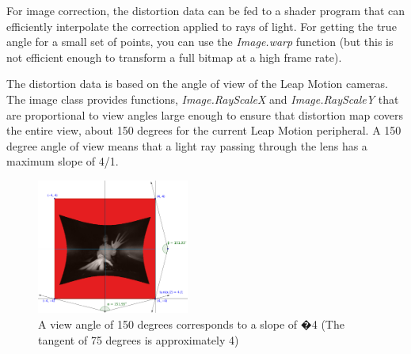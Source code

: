 \documentclass[journal]{IEEEtran}										    %
\begin{document}
                For image correction, the distortion data can be fed to a shader 
                program that can efficiently interpolate the correction applied to 
                rays of light. For getting the true angle for a small set of points, 
                you can use the \emph{Image.warp} function (but this is not efficient 
                enough to transform a full bitmap at a high frame rate).

                The distortion data is based on the angle of view of the Leap Motion 
                cameras. The image class provides functions, \emph{Image.RayScaleX} and 
                \emph{Image.RayScaleY} that are proportional to view angles large enough 
                to ensure that distortion map covers the entire view, about 150 degrees 
                for the current Leap Motion peripheral. A 150 degree angle of view means 
                that a light ray passing through the lens has a maximum slope of 4/1.

                \begin{figure}[h]
                    \centering
                    \includegraphics[width=5cm]{Leap-Image-Rays}
                    \caption{A view angle of 150 degrees corresponds to a slope of �4 
                    (The tangent of 75 degrees is approximately 4) \cite{TAG13}}
                    \label{fig:leapCam2}
                \end{figure}
\end{document}
